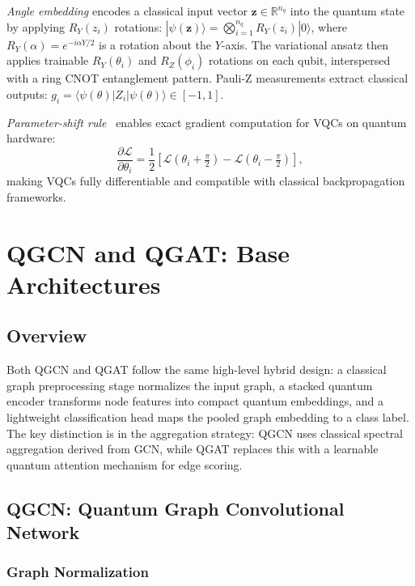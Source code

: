 \documentclass[journal]{IEEEtran}
\begin{document}
\emph{Angle embedding} encodes a classical input vector $\mathbf{z} \in
\mathbb{R}^{n_q}$ into the quantum state by applying $R_Y(z_i)$ rotations:
$|\psi(\mathbf{z})\rangle = \bigotimes_{i=1}^{n_q} R_Y(z_i)|0\rangle$,
where $R_Y(\alpha) = e^{-i\alpha Y/2}$ is a rotation about the $Y$-axis.
The variational ansatz then applies trainable $R_Y(\theta_i)$ and
$R_Z(\phi_i)$ rotations on each qubit, interspersed with a ring
CNOT entanglement pattern. Pauli-Z measurements extract classical
outputs:
$g_i = \langle\psi(\theta)|Z_i|\psi(\theta)\rangle \in [-1, 1]$.

\emph{Parameter-shift rule}~\cite{Mitarai2018} enables exact gradient
computation for VQCs on quantum hardware:
\begin{equation}
  \frac{\partial \mathcal{L}}{\partial \theta_i}
  = \frac{1}{2}\left[\mathcal{L}(\theta_i + \tfrac{\pi}{2})
  - \mathcal{L}(\theta_i - \tfrac{\pi}{2})\right],
  \label{eq:psr}
\end{equation}
making VQCs fully differentiable and compatible with classical
backpropagation frameworks.

\section{QGCN and QGAT: Base Architectures}
\label{sec:arch}

\subsection{Overview}

Both QGCN and QGAT follow the same high-level hybrid design: a classical
graph preprocessing stage normalizes the input graph, a stacked quantum
encoder transforms node features into compact quantum embeddings, and a
lightweight classification head maps the pooled graph embedding to a
class label. The key distinction is in the aggregation strategy: QGCN
uses classical spectral aggregation derived from GCN, while QGAT replaces
this with a learnable quantum attention mechanism for edge scoring.

\subsection{QGCN: Quantum Graph Convolutional Network}
\label{ssec:qgcn}

\subsubsection{Graph Normalization}
\end{document}
